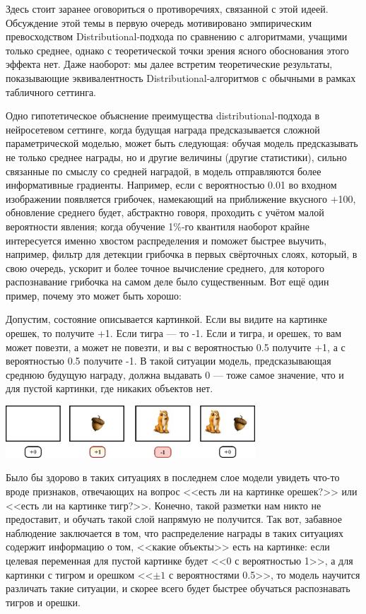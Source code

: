 Здесь стоит заранее оговориться о противоречиях, связанной с этой идеей. Обсуждение этой темы в первую очередь мотивировано эмпирическим превосходством Distributional-подхода по сравнению с алгоритмами, учащими только среднее, однако с теоретической точки зрения ясного обоснования этого эффекта нет. Даже наоборот: мы далее встретим теоретические результаты, показывающие эквивалентность Distributional-алгоритмов с обычными в рамках табличного сеттинга. 

Одно гипотетическое объяснение преимущества distributional-подхода в нейросетевом сеттинге, когда будущая награда предсказывается сложной параметрической моделью, может быть следующая: обучая модель предсказывать не только среднее награды, но и другие величины (другие статистики), сильно связанные по смыслу со средней наградой, в модель отправляются более информативные градиенты. Например, если с вероятностью 0.01 во входном изображении появляется грибочек, намекающий на приближение вкусного +100, обновление среднего будет, абстрактно говоря, проходить с учётом малой вероятности явления; когда обучение 1\%-го квантиля наоборот крайне интересуется именно хвостом распределения и поможет быстрее выучить, например, фильтр для детекции грибочка в первых свёрточных слоях, который, в свою очередь, ускорит и более точное вычисление среднего, для которого распознавание грибочка на самом деле было существенным. Вот ещё один пример, почему это может быть хорошо:

\begin{example}
Допустим, состояние описывается картинкой. Если вы видите на картинке орешек, то получите +1. Если тигра --- то -1. Если и тигра, и орешек, то вам может повезти, а может не повезти, и вы с вероятностью 0.5 получите +1, а с вероятностью 0.5 получите -1. В такой ситуации модель, предсказывающая среднюю будущую награду, должна выдавать 0 --- тоже самое значение, что и для пустой картинки, где никаких объектов нет.

\begin{center}
\vspace{0.2cm}
    \includegraphics[width=0.7\textwidth]{Images/CatAndFish.png}
\vspace{-0.2cm}
\end{center}

Было бы здорово в таких ситуациях в последнем слое модели увидеть что-то вроде признаков, отвечающих на вопрос <<есть ли на картинке орешек?>> или <<есть ли на картинке тигр?>>. Конечно, такой разметки нам никто не предоставит, и обучать такой слой напрямую не получится. Так вот, забавное наблюдение заключается в том, что распределение награды в таких ситуациях содержит информацию о том, <<какие объекты>> есть на картинке: если целевая переменная для пустой картинке будет <<0 с вероятностью 1>>, а для картинки с тигром и орешком <<$\pm 1$ с вероятностями 0.5>>, то модель научится различать такие ситуации, и скорее всего будет быстрее обучаться распознавать тигров и орешки. 
\end{example}

